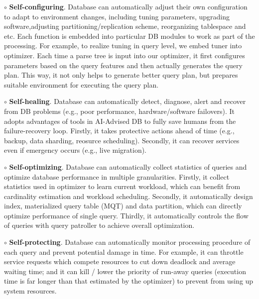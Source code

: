 $\circ$ \textbf{Self-configuring}. Database can automatically adjust their own configuration to adapt to environment changes, including tuning parameters, upgrading software,adjusting partitioning/replication scheme, reorganizing tablespace and etc. Each function is embedded into particular DB modules to work as part of the processing.  For example, to realize tuning in query level, we embed tuner into optimizer. Each time a parse tree is input into our optimizer, it first configures parameters based on the query features and then actually generates the query plan. This way, it not only helps to generate better query plan, but prepares suitable environment for executing the query plan. 

$\circ$ \textbf{Self-healing}. Database can automatically detect, diagnose, alert and recover from DB problems (e.g., poor performance, hardware/software failovers). It adopts advantages of tools in AI-Advised DB to fully save humans from the failure-recovery loop. Firstly, it takes protective actions ahead of time (e.g., backup, data sharding, reosurce scheduling). Secondly, it can recover services even if emergency occurs (e.g., live migration).



$\circ$ \textbf{Self-optimizing}. Database can automatically collect statistics of queries and optimize database performance in multiple granularities. Firstly, it collect statistics used in optimizer to learn current workload, which can benefit from cardinality estimation and workload scheduling. Secondly, it automatically design index, materialized query table (MQT) and data partition, which can directly optimize performance of single query. Thirdly, it automatically controls the flow of queries with query patroller to achieve overall optimization.

$\circ$ \textbf{Self-protecting}. Database can automatically monitor processing procedure of each query and prevent potential damage in time. For example, it can throttle service requests which compete resources to cut down deadlock and average waiting time; and it can kill / lower the priority of run-away queries (execution time is far longer than that estimated by the optimizer) to prevent from using up system resources.

